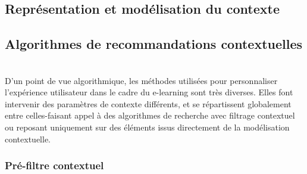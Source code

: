 \documentclass[conference]{./sty/IEEEtran}
\begin{document}
\subsection{Représentation et modélisation du contexte}

\subsection{Algorithmes de recommandations contextuelles}
~\\D'un point de vue algorithmique, les méthodes utilisées pour personnaliser l'expérience utilisateur dans le cadre du e-learning sont très diverses. Elles font intervenir des paramètres de contexte différents, et se répartissent globalement entre celles-faisant appel à des algorithmes de recherche avec filtrage contextuel ou reposant uniquement sur des éléments issus directement de la modélisation contextuelle.
\subsubsection{Pré-filtre contextuel}
~\\
\end{document}
